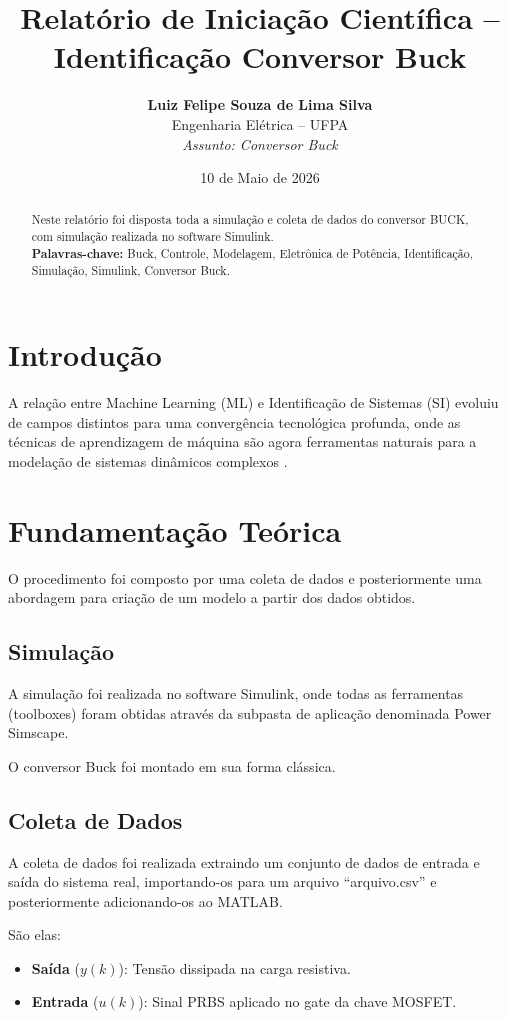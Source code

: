 \documentclass[twocolumn,10pt]{article}
\title{\textbf{Relatório de Iniciação Científica -- Identificação Conversor Buck}}
\author{\textbf{Luiz Felipe Souza de Lima Silva}\\
Engenharia Elétrica -- UFPA\\
\textit{Assunto: Conversor Buck}}
\date{10 de Maio de 2026}
\begin{document}
\maketitle

\begin{abstract}
Neste relatório foi disposta toda a simulação e coleta de dados do conversor BUCK, com simulação realizada no software Simulink.
\\[0.5em]
\textbf{Palavras-chave:} Buck, Controle, Modelagem, Eletrônica de Potência, Identificação, Simulação, Simulink, Conversor Buck.
\end{abstract}

\section{Introdução}
A relação entre Machine Learning (ML) e Identificação de Sistemas (SI) evoluiu de campos distintos para uma convergência tecnológica profunda, onde as técnicas de aprendizagem de máquina são agora ferramentas naturais para a modelação de sistemas dinâmicos complexos \cite{pillonetto2023deep}.

\section{Fundamentação Teórica}
O procedimento foi composto por uma coleta de dados e posteriormente uma abordagem para criação de um modelo a partir dos dados obtidos.

\subsection{Simulação}
A simulação foi realizada no software Simulink, onde todas as ferramentas (toolboxes) foram obtidas através da subpasta de aplicação denominada Power Simscape.

O conversor Buck foi montado em sua forma clássica.

\subsection{Coleta de Dados}
A coleta de dados foi realizada extraindo um conjunto de dados de entrada e saída do sistema real, importando-os para um arquivo ``arquivo.csv'' e posteriormente adicionando-os ao MATLAB.

São elas:
\begin{itemize}
    \item \textbf{Saída} ($y(k)$): Tensão dissipada na carga resistiva.
    \item \textbf{Entrada} ($u(k)$): Sinal PRBS aplicado no gate da chave MOSFET.
\end{itemize}
\end{document}
